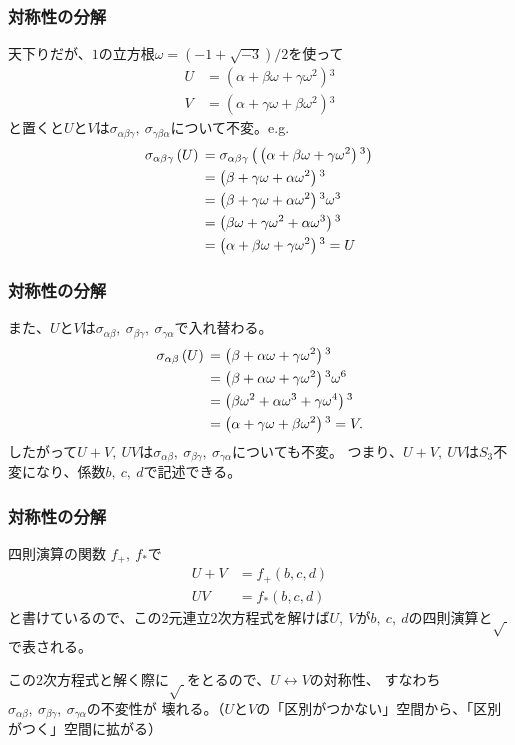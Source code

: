 \documentclass[12pt, t]{beamer}
\newcommand{\lr}[1]{\left({}#1\right){}}
\begin{document}
\begin{frame}
\frametitle{対称性の分解}
天下りだが、$1$の立方根$\omega = (-1 + \sqrt{-3})/2$を使って
\begin{align}
  U &= \lr{\alpha + \beta \omega + \gamma \omega^2}^3 \\
  V &= \lr{\alpha + \gamma \omega + \beta \omega^2}^3
\end{align}
と置くと$U$と$V$は$\sigma_{\alpha \beta \gamma},\ \sigma_{\gamma \beta \alpha}$について不変。e.g.
\begin{align}
  \sigma_{\alpha \beta \gamma}\lr{U} &= \sigma_{\alpha \beta \gamma}\lr{\lr{\alpha + \beta \omega + \gamma \omega^2}^3} \notag \\
                                     &= \lr{\beta + \gamma \omega + \alpha \omega^2}^3 \notag \\
                                     &= \lr{\beta + \gamma \omega + \alpha \omega^2}^3 \omega^3 \notag \\
                                     &= \lr{\beta \omega + \gamma \omega^2 + \alpha \omega^3}^3 \notag \\
                                     &= \lr{\alpha + \beta \omega + \gamma \omega^2}^3 = U
\end{align}
\end{frame}

\begin{frame}
\frametitle{対称性の分解}
また、$U$と$V$は$\sigma_{\alpha \beta},\ \sigma_{\beta \gamma},\ \sigma_{\gamma \alpha}$で入れ替わる。
\begin{align}
  \sigma_{\alpha \beta}\lr{U} &= \lr{\beta + \alpha \omega + \gamma \omega^2}^3 \notag \\
                              &= \lr{\beta + \alpha \omega + \gamma \omega^2}^3 \omega^6 \notag \\
                              &= \lr{\beta \omega^2+ \alpha \omega^3 + \gamma \omega^4}^3 \notag \\
                              &= \lr{\alpha + \gamma \omega + \beta \omega^2}^3 = V.
\end{align}
したがって$U + V,\ UV$は$\sigma_{\alpha \beta},\ \sigma_{\beta \gamma},\ \sigma_{\gamma \alpha}$についても不変。
つまり、$U + V,\ UV$は$S_3$不変になり、係数$b,\ c,\ d$で記述できる。
\end{frame}

\begin{frame}
\frametitle{対称性の分解}
四則演算の関数 $f_+,\ f_\ast$で
\begin{align}
  U + V &= f_+(b, c, d) \\
  U V &= f_\ast(b, c, d)
\end{align}
と書けているので、この$2$元連立$2$次方程式を解けば$U,\ V$が$b,\ c,\ d$の四則演算と$\sqrt{\ }$で表される。

この$2$次方程式と解く際に$\sqrt{\ }$をとるので、$U \leftrightarrow V$の対称性、
すなわち$\sigma_{\alpha \beta},\ \sigma_{\beta \gamma},\ \sigma_{\gamma \alpha}$の不変性が
壊れる。（$U$と$V$の「区別がつかない」空間から、「区別がつく」空間に拡がる）
\end{frame}
\end{document}
